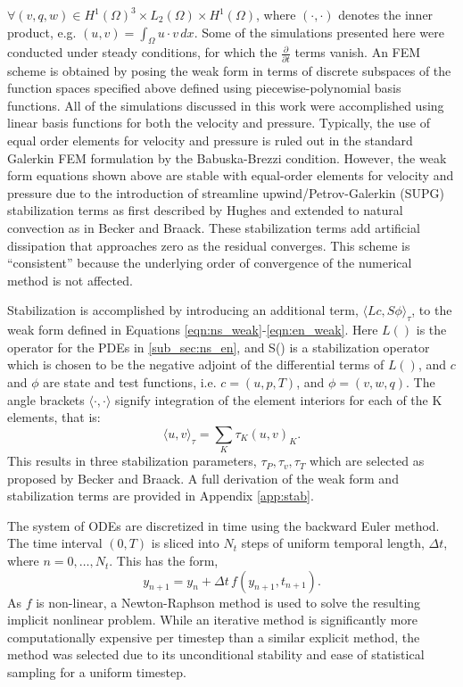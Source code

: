 $\forall (v,q,w) \in H^1(\Omega)^3 \times L_2(\Omega) \times
H^1(\Omega)$, where $(\cdot,\cdot)$ denotes the inner product,
e.g. $(u,v) = \int_\Omega u \cdot v \, dx$.   
Some of the simulations presented here were conducted under
steady conditions, for which the $\frac{\partial}{\partial t}$ terms
vanish. An FEM scheme is obtained by posing the weak form in
terms of discrete subspaces of the function spaces specified above
defined using piecewise-polynomial basis functions. All of the
simulations discussed in this work were accomplished using 
linear basis functions for both the velocity and pressure. 
Typically, the use of equal order elements for velocity and pressure is
ruled out in the standard Galerkin FEM formulation by the Babuska-Brezzi
condition\cite{bb-cond}. 
However, the weak form equations shown above are stable with equal-order
elements for velocity and pressure due to the introduction of streamline
upwind/Petrov-Galerkin (SUPG) stabilization terms as first described by
Hughes\cite{Hughes198685,supg} and extended to natural convection as in
Becker and Braack\cite{Becker2002428}. These stabilization terms add
artificial dissipation that approaches zero as the residual
converges. This scheme is ``consistent'' because the underlying order of
convergence of the numerical method is not affected\cite{hughes2000finite}. 

Stabilization is accomplished by introducing an additional term,
$\langle Lc,S\phi \rangle_\tau$, to the weak form defined in Equations
\ref{eqn:ns_weak}-\ref{eqn:en_weak}. Here $L()$ is the operator for the PDEs
in \ref{sub_sec:ns_en}, and S() is a stabilization operator
which is chosen to be the negative adjoint of the differential terms of
$L()$, and $c$ and $\phi$ are state and test functions, i.e. 
$ c= (u,p,T)$, and $\phi = ( v,w,q )$. 
The angle brackets $\langle \cdot,\cdot \rangle$ signify integration of
the element interiors for each of the K elements, that is:
\begin{equation}
 \langle u,v \rangle_\tau = \sum_K \tau_K(u,v)_K.
\end{equation}
This results in three stabilization parameters, $\tau_P, \tau_v, \tau_T$ 
which are selected as proposed by Becker and Braack. 
A full derivation of the weak form and stabilization terms are provided
in Appendix \ref{app:stab}. 

The system of ODEs are discretized in time using the 
backward Euler method\cite{moin2010fundamentals}. The time interval
$(0,T)$ is sliced into $N_t$ steps of 
uniform temporal length,  $\Delta t$, where $n = 0,\dots,N_t$. 
This has the form, 
\begin{equation}
 y_{n+1} = y_n + \Delta t \, f(y_{n+1},t_{n+1}).
\end{equation}
As $f$ is non-linear, a Newton-Raphson method is used to solve the
resulting implicit nonlinear problem. While an iterative method is
significantly more computationally expensive per timestep than a similar
explicit method, the method was selected due to its unconditional
stability and ease of statistical sampling for a uniform timestep. 

